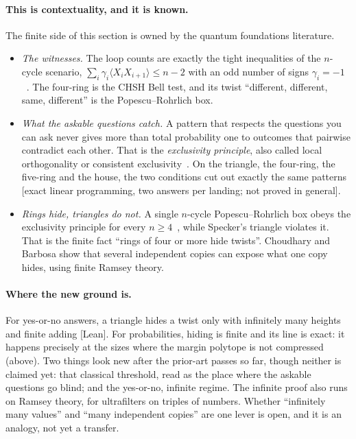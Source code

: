 \documentclass[11pt]{article}
\newcommand{\st}[1]{\textsf{\small[#1]}}
\begin{document}
\paragraph{This is contextuality, and it is known.} The finite side of this
section is owned by the quantum foundations literature.
\begin{itemize}[nosep]
  \item \emph{The witnesses.} The loop counts are exactly the tight
    inequalities of the $n$-cycle scenario, $\sum_i\gamma_i\langle
    X_iX_{i+1}\rangle\le n-2$ with an odd number of signs
    $\gamma_i=-1$~\cite{araujo2013}. The four-ring is the CHSH Bell test, and its
    twist ``different, different, same, different'' is the Popescu--Rohrlich box.
  \item \emph{What the askable questions catch.} A pattern that respects the
    questions you can ask never gives more than total probability one to
    outcomes that pairwise contradict each other. That is the \emph{exclusivity
    principle}, also called local orthogonality or consistent
    exclusivity~\cite{cabello2013,fritz2013,abramskybarbosa2021}. On the
    triangle, the four-ring, the five-ring and the house, the two conditions cut
    out exactly the same patterns \st{exact linear programming, two answers per
    landing; not proved in general}.
  \item \emph{Rings hide, triangles do not.} A single $n$-cycle
    Popescu--Rohrlich box obeys the exclusivity principle for every
    $n\ge 4$~\cite{choudharybarbosa2024}, while Specker's triangle violates it.
    That is the finite fact ``rings of four or more hide twists''. Choudhary and
    Barbosa show that several independent copies can expose what one copy hides,
    using finite Ramsey theory.
\end{itemize}

\paragraph{Where the new ground is.} For yes-or-no answers, a triangle hides a
twist only with infinitely many heights and finite adding \st{Lean}. For
probabilities, hiding is finite and its line is exact: it happens precisely at the
sizes where the margin polytope is not compressed (above). Two things look new after
the prior-art passes so far, though neither is claimed yet: that classical
threshold, read as the place where the askable questions go blind; and the
yes-or-no, infinite regime. The infinite proof also runs on Ramsey theory, for ultrafilters on triples
of numbers. Whether ``infinitely many values'' and ``many independent copies''
are one lever is open, and it is an analogy, not yet a transfer.
\end{document}
